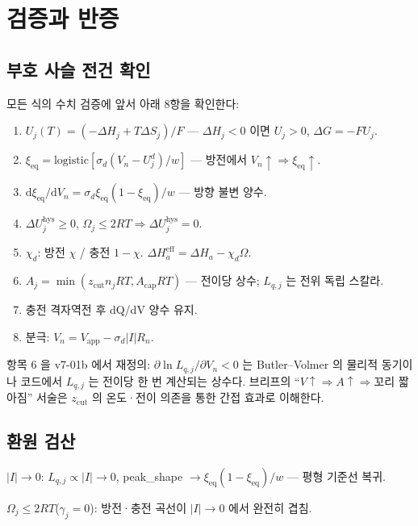 \documentclass[11pt,a4paper]{article}
\newcommand{\dd}{\mathrm{d}}
\newcommand{\app}{\mathrm{app}}
\newcommand{\eq}{\mathrm{eq}}
\newcommand{\eff}{\mathrm{eff}}
\newcommand{\hys}{\mathrm{hys}}
\begin{document}
\section{검증과 반증}\label{sec:falsify}

\subsection{부호 사슬 전건 확인}

모든 식의 수치 검증에 앞서 아래 8항을 확인한다:
\begin{enumerate}[label=(\arabic*),leftmargin=2em,itemsep=1pt]
\item $U_j(T) = (-\Delta H_j + T\Delta S_j)/F$ — $\Delta H_j<0$ 이면 $U_j>0$, $\Delta G = -FU_j$.
\item $\xi_\eq = \mathrm{logistic}[\sigma_d(V_n-U_j^d)/w]$ — 방전에서 $V_n\uparrow\Rightarrow\xi_\eq\uparrow$.
\item $\dd\xi_\eq/\dd V_n = \sigma_d\xi_\eq(1-\xi_\eq)/w$ — 방향 불변 양수.
\item $\Delta U_j^\hys\ge0$, $\Omega_j\le2RT\Rightarrow\Delta U_j^\hys=0$.
\item $\chi_d$: 방전 $\chi$ / 충전 $1-\chi$. $\Delta H_a^\eff = \Delta H_a - \chi_d\Omega$.
\item $A_j = \min(z_\mathrm{cut} n_j RT, A_\mathrm{cap}RT)$ — 전이당 상수; $L_{q,j}$ 는 전위 독립 스칼라.
\item 충전 격자역전 후 dQ/dV 양수 유지.
\item 분극: $V_n = V_\app - \sigma_d|I|R_n$.
\end{enumerate}

항목 6 을 v7-01b 에서 재정의: $\partial\ln L_{q,j}/\partial V_n<0$ 는 Butler--Volmer 의
물리적 동기이나 코드에서 $L_{q,j}$ 는 전이당 한 번 계산되는 상수다. 브리프의
``$V\uparrow\Rightarrow A\uparrow\Rightarrow$꼬리 짧아짐'' 서술은 $z_\mathrm{cut}$ 의
온도·전이 의존을 통한 간접 효과로 이해한다.

\subsection{환원 검산}

$|I|\to0$: $L_{q,j}\propto|I|\to0$, peak\_shape $\to\xi_\eq(1-\xi_\eq)/w$ — 평형 기준선 복귀.

$\Omega_j\le2RT$($\gamma_j=0$): 방전·충전 곡선이 $|I|\to0$ 에서 완전히 겹침.
\end{document}
